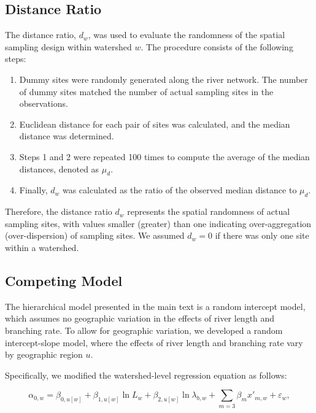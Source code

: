 \documentclass[11pt, class=article, crop=false]{standalone}
\theoremstyle{definition}
\begin{document}
\subsection{Distance Ratio}

The distance ratio, $d_{w}$, was used to evaluate the randomness of the spatial sampling design within watershed $w$.
The procedure consists of the following steps:

\begin{enumerate}
    \item Dummy sites were randomly generated along the river network. The number of dummy sites matched the number of actual sampling sites in the observations.
    \item Euclidean distance for each pair of sites was calculated, and the median distance was determined.
    \item Steps 1 and 2 were repeated 100 times to compute the average of the median distances, denoted as $\mu_d$.
    \item Finally, $d_{w}$ was calculated as the ratio of the observed median distance to $\mu_d$.
\end{enumerate}

Therefore, the distance ratio $d_{w}$ represents the spatial randomness of actual sampling sites, with values smaller (greater) than one indicating over-aggregation (over-dispersion) of sampling sites.
We assumed $d_{w} = 0$ if there was only one site within a watershed.

\subsection{Competing Model}

The hierarchical model presented in the main text is a random intercept model, which assumes no geographic variation in the effects of river length and branching rate. To allow for geographic variation, we developed a random intercept-slope model, where the effects of river length and branching rate vary by geographic region $u$.

Specifically, we modified the watershed-level regression equation as follows:

\begin{equation}
    \alpha_{0, w} = \beta_{0, u[w]} + \beta_{1, u[w]} \ln L_w + \beta_{2, u[w]} \ln \lambda_{b, w} + \sum_{m=3} \beta_m x'_{m, w} + \varepsilon_{w},
    \label{eq:watershed-average}
\end{equation}
\end{document}
